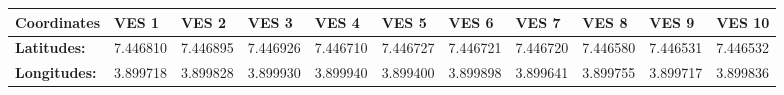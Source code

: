 \documentclass[12pt,a4paper]{report}
\begin{document}
\begin{table}[h!]
    \centering
    \begin{adjustbox}{max width=\textwidth}
    \renewcommand{\arraystretch}{1.5}
    \begin{tabular}{|p{2.5cm}|p{1.5cm}|p{1.8cm}|p{1.5cm}|p{1.8cm}|p{1.5cm}|p{1.8cm}|p{1.5cm}|p{1.8cm}|p{1.5cm}|p{1.8cm}|}
    \hline
    \textbf{Coordinates} &  
    \textbf{VES 1} & 
    \textbf{VES 2} & 
    \textbf{VES 3} & 
    \textbf{VES 4} & 
    \textbf{VES 5} & 
    \textbf{VES 6} & 
    \textbf{VES 7} & 
    \textbf{VES 8} & 
    \textbf{VES 9} & 
    \textbf{VES 10} \\ 
    \hline
    \textbf{Latitudes:} & 7.446810 & 7.446895 & 7.446926 & 7.446710 & 7.446727 & 7.446721 & 7.446720 & 7.446580 & 7.446531 & 7.446532 \\ \hline
    \textbf{Longitudes:} & 3.899718 & 3.899828 & 3.899930 & 3.899940 & 3.899400 & 3.899898 & 3.899641 & 3.899755 & 3.899717 & 3.899836 \\ \hline
    \end{tabular}
    \end{adjustbox}
    \label{tab:UI Mosque VES Coordinates: 1-0}
\end{table}
\end{document}
